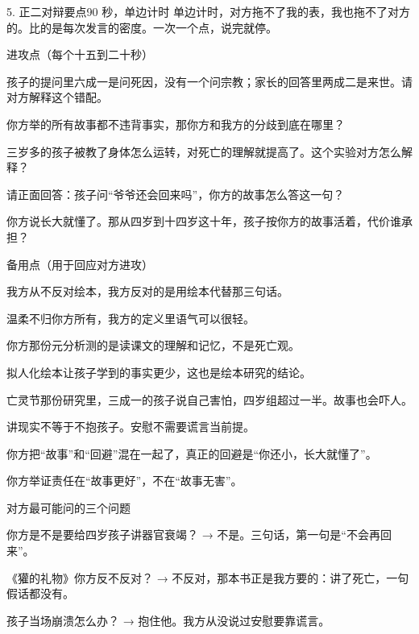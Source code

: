 \documentclass[script,pro]{debate}
\begin{document}
\begin{stage}{5. 正二对辩要点}{90 秒，单边计时}
单边计时，对方拖不了我的表，我也拖不了对方的。比的是每次发言的密度。一次一个点，说完就停。

\begin{points}{进攻点（每个十五到二十秒）}
\item 孩子的提问里六成一是问死因，没有一个问宗教；家长的回答里两成二是来世。请对方解释这个错配。
\item 你方举的所有故事都不违背事实，那你方和我方的分歧到底在哪里？
\item 三岁多的孩子被教了身体怎么运转，对死亡的理解就提高了。这个实验对方怎么解释？
\item 请正面回答：孩子问“爷爷还会回来吗”，你方的故事怎么答这一句？
\item 你方说长大就懂了。那从四岁到十四岁这十年，孩子按你方的故事活着，代价谁承担？
\end{points}
\begin{points}{备用点（用于回应对方进攻）}
\item 我方从不反对绘本，我方反对的是用绘本代替那三句话。
\item 温柔不归你方所有，我方的定义里语气可以很轻。
\item 你方那份元分析测的是读课文的理解和记忆，不是死亡观。
\item 拟人化绘本让孩子学到的事实更少，这也是绘本研究的结论。
\item 亡灵节那份研究里，三成一的孩子说自己害怕，四岁组超过一半。故事也会吓人。
\item 讲现实不等于不抱孩子。安慰不需要谎言当前提。
\item 你方把“故事”和“回避”混在一起了，真正的回避是“你还小，长大就懂了”。
\item 你方举证责任在“故事更好”，不在“故事无害”。
\end{points}
\begin{points}{对方最可能问的三个问题}
\item 你方是不是要给四岁孩子讲器官衰竭？ → 不是。三句话，第一句是“不会再回来”。
\item 《獾的礼物》你方反不反对？ → 不反对，那本书正是我方要的：讲了死亡，一句假话都没有。
\item 孩子当场崩溃怎么办？ → 抱住他。我方从没说过安慰要靠谎言。
\end{points}
\end{stage}
\end{document}
